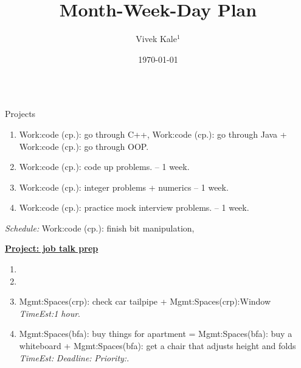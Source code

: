 \documentclass[serif, mathserif, final]{beamer}
\title{Month-Week-Day Plan}\author{Vivek Kale$^1$}\institute{$^1$ University of Illinois at Urbana-Champaign}\date{\today}
\newcommand{\te}[1]{\textit{TimeEst:}\textit{#1}}
\newcommand{\dl}[1]{\textit{Deadline:}\textit{#1}}
\newcommand{\pr}[1]{\textit{Priority:}\textit{#1}}
\begin{document}
\begin{frame}
\begin{columns}

\begin{column}{0.5\textwidth}
\begin{block}{Projects}
\begin{enumerate}
\tiny \item \tiny Work:code (cp.): go through C++, Work:code (cp.): go through Java + Work:code (cp.): go through OOP. 
\item \tiny Work:code (cp.): code up problems.  – 1 week.
\item \tiny Work:code (cp.): integer problems + numerics   -- 1 week. 
\item \tiny Work:code (cp.): practice mock interview problems. – 1 week. 
\end{enumerate}
{\it Schedule:} Work:code (cp.): finish bit manipulation,


{\underline{\bf Project: job talk prep}}
\begin{enumerate} 
\tiny \item \tiny 
\item \tiny 
\item \tiny Mgmt:Spaces(crp): check car tailpipe +
  Mgmt:Spaces(crp):Window \te{1 hour}.
\item \tiny Mgmt:Spaces(bfa): buy things for apartment =
  Mgmt:Spaces(bfa): buy a whiteboard + Mgmt:Spaces(bfa): get a chair
  that adjusts height and folds \te{} \dl{} \pr{}. 


\end{enumerate}


\end{block}
\end{column}
\end{columns}
\end{frame}
\end{document}

